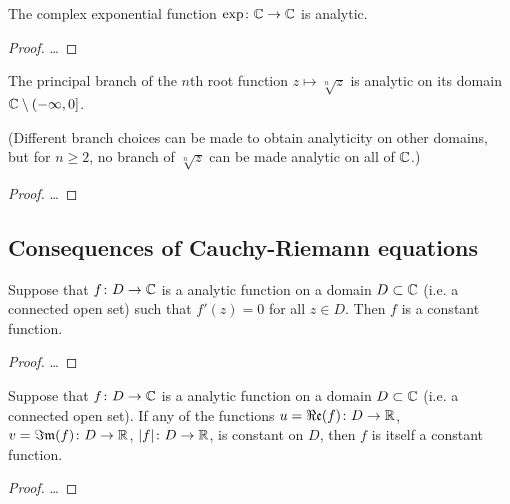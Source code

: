 \begin{lemma}
  \label{lem:exp_analytic}
  The complex exponential function $\exp \colon \mathbb{C} \to \mathbb{C}$ is analytic.
\end{lemma}
\begin{proof}
  \ldots
\end{proof}

\begin{lemma}
  \label{lem:root_function_analytic}
  The principal branch of the $n$th root function
  $z \mapsto \sqrt[n]{z}$ is analytic on its domain
  $\mathbb{C} \setminus (-\infty,0]$.

  (Different branch choices can be made to obtain analyticity on
  other domains, but for $n \ge 2$,
  no branch of $\sqrt[n]{z}$ can be made analytic on all of $\mathbb{C}$.)
\end{lemma}
\begin{proof}
  \ldots
\end{proof}



\subsection{Consequences of Cauchy-Riemann equations}

\begin{lemma}
  \label{lem:zero_derivative_implies_constant}
  Suppose that $f \colon D \to \mathbb{C}$ is a analytic function
  on a domain $D \subset \mathbb{C}$ (i.e. a connected open set)
  such that $f'(z) = 0$ for all $z \in D$.
  Then $f$ is a constant function.
\end{lemma}
\begin{proof}
  \ldots
\end{proof}

\begin{theorem}
  \label{thm:constantness_criteria}
  Suppose that $f \colon D \to \mathbb{C}$ is a analytic function
  on a domain $D \subset \mathbb{C}$ (i.e. a connected open set).
  If any of the functions $u = \Re\mathfrak{e}(f) \colon D \to \mathbb{R}$,
  $v = \Im\mathfrak{m}(f) \colon D \to \mathbb{R}$, $|f| \colon D \to \mathbb{R}$,
  is constant on $D$, then $f$ is itself a constant function.
\end{theorem}
\begin{proof}
  \ldots
\end{proof}
